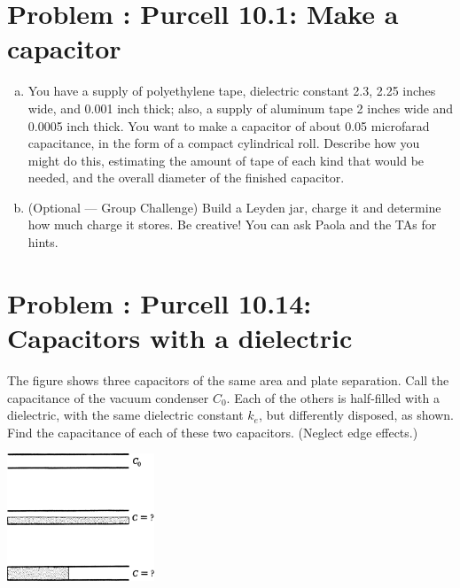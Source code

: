 \documentclass[problems]{esg8022pset}
\begin{document}
\section{Problem \thesection: Purcell 10.1: Make a capacitor}
  \begin{enumerate}[(a)]
    \item You have a supply of polyethylene tape, dielectric constant
      2.3, 2.25 inches wide, and 0.001 inch thick; also, a supply of aluminum
      tape 2 inches wide and 0.0005 inch thick. You want to make a capacitor
      of about 0.05 microfarad capacitance, in the form of a compact
      cylindrical roll. Describe how you might do this, estimating the
      amount of tape of each kind that would be needed, and the overall
      diameter of the finished capacitor.
    \item (Optional --- Group Challenge) Build a Leyden jar, charge it
      and determine how much charge it stores. Be creative!  You can ask
      Paola and the TAs for hints.
  \end{enumerate}
\section{Problem \thesection: Purcell 10.14: Capacitors with a dielectric}
  The figure shows three capacitors of the same area and plate
  separation. Call the capacitance of the vacuum condenser $C_0$. Each of
  the others is half-filled with a dielectric, with the same dielectric constant
  $k_e$, but differently disposed, as shown. Find the capacitance of
  each of these two capacitors. (Neglect edge effects.)
  \begin{center}\includegraphics[width=0.33\textwidth]{ps04_08}\end{center}
\end{document}

